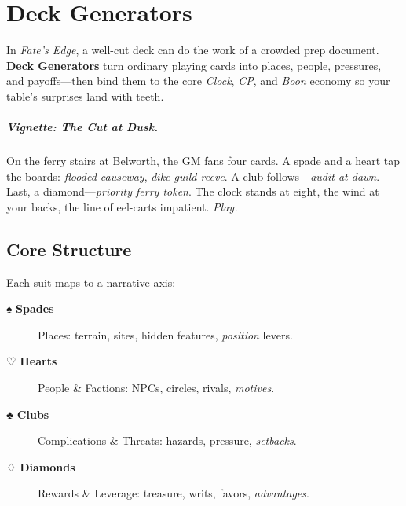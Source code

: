 
\chapter{Deck Generators}
\label{ch:deck-generators}

\begin{multicols}{2}

In \textit{Fate’s Edge}, a well-cut deck can do the work of a crowded prep document. \textbf{Deck Generators} turn ordinary playing cards into places, people, pressures, and payoffs—then bind them to the core \emph{Clock}, \emph{CP}, and \emph{Boon} economy so your table’s surprises land with teeth.

\paragraph{Vignette: The Cut at Dusk.}
On the ferry stairs at Belworth, the GM fans four cards. A spade and a heart tap the boards: \emph{flooded causeway}, \emph{dike-guild reeve}. A club follows—\emph{audit at dawn}. Last, a diamond—\emph{priority ferry token}. The clock stands at eight, the wind at your backs, the line of eel-carts impatient. \emph{Play.}

\section{Core Structure}
Each suit maps to a narrative axis:

\begin{description}
  \item[{\large ♠} \textbf{Spades}] Places: terrain, sites, hidden features, \emph{position} levers.
  \item[{\large ♡} \textbf{Hearts}] People \& Factions: NPCs, circles, rivals, \emph{motives}.
  \item[{\large ♣} \textbf{Clubs}] Complications \& Threats: hazards, pressure, \emph{setbacks}.
  \item[{\large ♢} \textbf{Diamonds}] Rewards \& Leverage: treasure, writs, favors, \emph{advantages}.
\end{description}


\end{multicols}

